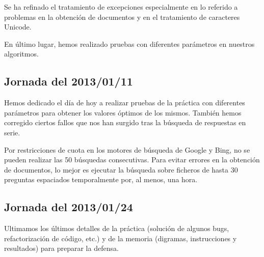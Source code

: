 \documentclass[12pt,a4paper,titlepage]{article}
\begin{document}
Se ha refinado el tratamiento de excepciones especialmente en lo referido a problemas en la obtención de documentos y en el tratamiento de caracteres Unicode.

En último lugar, hemos realizado pruebas con diferentes parámetros en nuestros algoritmos.

\subsection{Jornada del 2013/01/11}
Hemos dedicado el día de hoy a realizar pruebas de la práctica con diferentes parámetros para obtener los valores óptimos de los mismos. También hemos corregido ciertos fallos que nos han surgido tras la búsqueda de respuestas en serie.

Por restricciones de cuota en los motores de búsqueda de Google y Bing, no se pueden realizar las 50 búsquedas consecutivas. Para evitar errores en la obtención de documentos, lo mejor es ejecutar la búsqueda sobre ficheros de hasta 30 preguntas espaciados temporalmente por, al menos, una hora.

\subsection{Jornada del 2013/01/24}
Ultimamos los últimos detalles de la práctica (solución de algunos bugs, refactorización de código, etc.) y de la memoria (digramas, instrucciones y resultados) para preparar la defensa.

\clearpage
\end{document}
